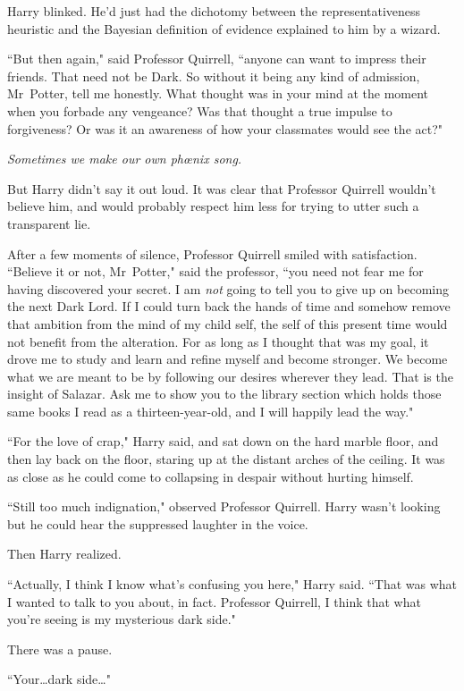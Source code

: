 Harry blinked. He'd just had the dichotomy between the representativeness heuristic and the Bayesian definition of evidence explained to him by a wizard.

``But then again," said Professor Quirrell, ``anyone can want to impress their friends. That need not be Dark. So without it being any kind of admission, Mr~Potter, tell me honestly. What thought was in your mind at the moment when you forbade any vengeance? Was that thought a true impulse to forgiveness? Or was it an awareness of how your classmates would see the act?"

\emph{Sometimes we make our own phœnix song.}

But Harry didn't say it out loud. It was clear that Professor Quirrell wouldn't believe him, and would probably respect him less for trying to utter such a transparent lie.

After a few moments of silence, Professor Quirrell smiled with satisfaction. ``Believe it or not, Mr~Potter," said the professor, ``you need not fear me for having discovered your secret. I am \emph{not} going to tell you to give up on becoming the next Dark Lord. If I could turn back the hands of time and somehow remove that ambition from the mind of my child self, the self of this present time would not benefit from the alteration. For as long as I thought that was my goal, it drove me to study and learn and refine myself and become stronger. We become what we are meant to be by following our desires wherever they lead. That is the insight of Salazar. Ask me to show you to the library section which holds those same books I read as a thirteen-year-old, and I will happily lead the way."

``For the love of crap," Harry said, and sat down on the hard marble floor, and then lay back on the floor, staring up at the distant arches of the ceiling. It was as close as he could come to collapsing in despair without hurting himself.

``Still too much indignation," observed Professor Quirrell. Harry wasn't looking but he could hear the suppressed laughter in the voice.

Then Harry realized.

``Actually, I think I know what's confusing you here," Harry said. ``That was what I wanted to talk to you about, in fact. Professor Quirrell, I think that what you're seeing is my mysterious dark side."

There was a pause.

``Your…dark side…"

